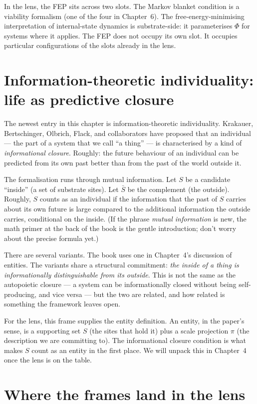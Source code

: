 In the lens, the FEP sits across two slots. The Markov blanket condition
is a viability formalism (one of the four in Chapter~6). The
free-energy-minimising interpretation of internal-state dynamics is
substrate-side: it parameterises $\Phi$ for systems where it applies. The
FEP does not occupy its own slot. It occupies particular configurations
of the slots already in the lens.

\section{Information-theoretic individuality: life as predictive closure}

The newest entry in this chapter is information-theoretic individuality.
Krakauer, Bertschinger, Olbrich, Flack, and collaborators have proposed
that an individual --- the part of a system that we call ``a thing'' ---
is characterised by a kind of \emph{informational closure}. Roughly: the
future behaviour of an individual can be predicted from its own past
better than from the past of the world outside it.

The formalisation runs through mutual information. Let $S$ be a candidate
``inside'' (a set of substrate sites). Let $\bar S$ be the complement
(the outside). Roughly, $S$ counts as an individual if the information
that the past of $S$ carries about its own future is large compared to
the additional information the outside carries, conditional on the
inside. (If the phrase \emph{mutual information} is new, the math primer
at the back of the book is the gentle introduction; don't worry about
the precise formula yet.)

There are several variants. The book uses one in Chapter~4's discussion
of entities. The variants share a structural commitment: \emph{the inside
of a thing is informationally distinguishable from its outside}. This is
not the same as the autopoietic closure --- a system can be
informationally closed without being self-producing, and vice versa ---
but the two are related, and how related is something the framework
leaves open.

For the lens, this frame supplies the entity definition. An entity, in
the paper's sense, is a supporting set $S$ (the sites that hold it) plus
a scale projection $\pi$ (the description we are committing to). The
informational closure condition is what makes $S$ count as an entity in
the first place. We will unpack this in Chapter~4 once the lens is on the
table.

\section{Where the frames land in the lens}

